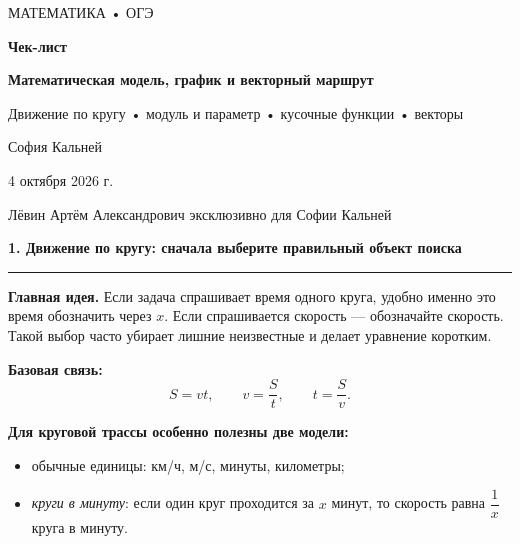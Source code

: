 \documentclass[a4paper,12pt]{article}
\newcommand{\sectiontitle}[1]{%
  \vspace{2mm}%
  {\Large\bfseries\color{darkaccent}#1}\par\vspace{2mm}%
  {\color{accent!55}\rule{\linewidth}{0.6pt}}\par\vspace{2mm}%
}
\newcommand{\keyidea}[1]{\textbf{\color{darkaccent}#1}}
\begin{document}
\thispagestyle{empty}
\begin{center}
\vspace*{28mm}
{\small\color{softgray}МАТЕМАТИКА • ОГЭ}\par
\vspace{9mm}
{\fontsize{27}{31}\selectfont\bfseries\color{darkaccent}Чек-лист}\par
\vspace{4mm}
{\LARGE\bfseries Математическая модель, график и векторный маршрут}\par
\vspace{8mm}
{\large Движение по кругу • модуль и параметр • кусочные функции • векторы}\par
\vspace{21mm}
{\large София Кальней}\par
\vspace{4mm}
{\normalsize 4 октября 2026 г.}\par
\vfill
{\small\color{textgray}Лёвин Артём Александрович эксклюзивно для Софии Кальней}\par
\vspace{22mm}
\end{center}


\clearpage

\sectiontitle{1. Движение по кругу: сначала выберите правильный объект поиска}

\keyidea{Главная идея.} Если задача спрашивает время одного круга, удобно именно это время обозначить через $x$. Если спрашивается скорость --- обозначайте скорость. Такой выбор часто убирает лишние неизвестные и делает уравнение коротким.

\textbf{Базовая связь:}
\[
S=vt,\qquad v=\frac{S}{t},\qquad t=\frac{S}{v}.
\]

\textbf{Для круговой трассы особенно полезны две модели:}
\begin{itemize}
  \item обычные единицы: км/ч, м/с, минуты, километры;
  \item \emph{круги в минуту}: если один круг проходится за $x$ минут, то скорость равна $\dfrac{1}{x}$ круга в минуту.
\end{itemize}
\end{document}
